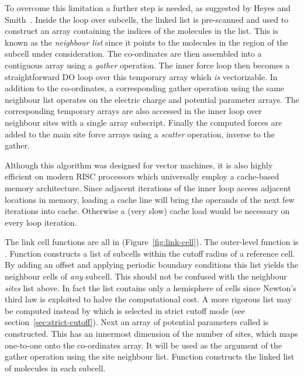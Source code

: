 \documentclass[a4paper,twoside]{report}
\begin{document}
To overcome this limitation a further step is needed, as suggested by
Heyes and Smith~\cite{heyes:87}.  Inside the loop over subcells, the
linked list is pre-scanned and used to construct an array containing
the indices of the molecules in the list.  This is known as the
\emph{neighbour list} since it points to the molecules in the region
of the subcell under consideration. The co-ordinates are then
assembled into a contiguous array using a \emph{gather} operation.  The
inner force loop then becomes a straightforward DO loop over this
temporary array which \emph{is} vectorizable.  In addition to the
co-ordinates, a corresponding gather operation using the same neighbour
list operates on the electric charge and potential parameter arrays.
The corresponding temporary arrays are also accessed in the inner loop
over neighbour sites with a single array subscript.  Finally the
computed forces are added to the main site force arrays using a
\emph{scatter} operation, inverse to the gather.

Although this algorithm was designed for vector machines, it is also
highly efficient on modern RISC processors which universally employ a
cache-based memory architecture.  Since adjacent iterations of the
inner loop access adjacent locations in memory, loading a cache line
will bring the operands of the next few iterations into cache.
Otherwise a (very slow) cache load would be necessary on every loop
iteration. 

The link cell functions are all in 
(Figure~\ref{fig:link-cell}).  The outer-level function is
.  Function 
constructs a list of subcells within the cutoff radius of a reference
cell.  By adding an offset and applying periodic boundary conditions
this list yields the neighbour cells of \emph{any} subcell.  This
should not be confused with the neighbour \emph{sites} list above.  In
fact the list contains only a hemisphere of cells since Newton's third
law is exploited to halve the computational cost.  A more rigorous
list may be computed instead by 
which is selected in strict cutoff mode (see
section~\ref{sec:strict-cutoff}).  Next an array of potential
parameters called  is constructed.  This has an innermost
dimension of the number of sites, which maps one-to-one onto the
co-ordinates array. It will be used as the argument of the gather
operation using the site neighbour list.  Function
 constructs the linked list of molecules in each
subcell.
\end{document}
